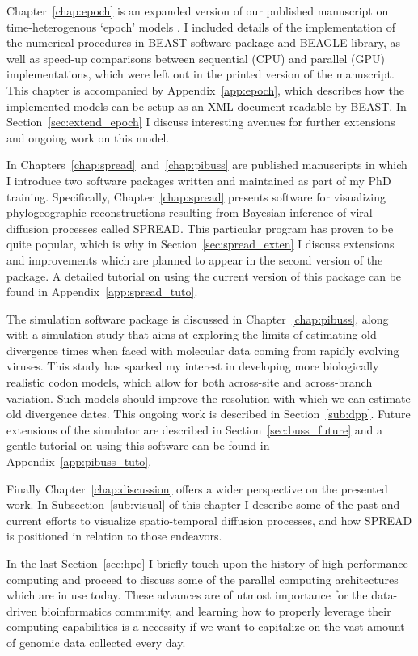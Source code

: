 Chapter~\ref{chap:epoch} is an expanded version of our published manuscript on time-heterogenous `epoch' models \citep{Bielejec2014a}.
I included details of the implementation of the numerical procedures in BEAST software package and BEAGLE library, as well as speed-up comparisons between sequential (CPU) and parallel (GPU) implementations, which were left out in the printed version of the manuscript.
This chapter is accompanied by Appendix~\ref{app:epoch}, which describes how the implemented models can be setup as an XML document readable by BEAST.
In Section~\ref{sec:extend_epoch} I discuss interesting avenues for further extensions and ongoing work on this model.

In Chapters~\ref{chap:spread}~and~\ref{chap:pibuss} are published manuscripts in which I introduce two software packages written and maintained as part of my PhD training.
Specifically, Chapter~\ref{chap:spread} presents software for visualizing phylogeographic reconstructions resulting from Bayesian inference of viral diffusion processes called SPREAD.
This particular program has proven to be quite popular, which is why in Section~\ref{sec:spread_exten} I discuss extensions and improvements which are planned to appear in the second version of the package.
A detailed tutorial on using the current version of this package can be found in Appendix~\ref{app:spread_tuto}.

The {\bussname} simulation software package is discussed in Chapter~\ref{chap:pibuss}, along with a simulation study that aims at exploring the limits of estimating old divergence times when faced with molecular data coming from rapidly evolving viruses.
This study has sparked my interest in developing more biologically realistic codon models, which allow for both across-site and across-branch variation.
Such models should improve the resolution with which we can estimate old divergence dates. %
This ongoing work is described in Section~\ref{sub:dpp}.
Future extensions of the {\bussname} simulator are described in Section~\ref{sec:buss_future} and a gentle tutorial on using this software can be found in Appendix~\ref{app:pibuss_tuto}.

Finally Chapter~\ref{chap:discussion} offers a wider perspective on the presented work. 
In Subsection~\ref{sub:visual} of this chapter I describe some of the past and current efforts to visualize spatio-temporal diffusion processes, and how SPREAD is positioned in relation to those endeavors.

In the last Section~\ref{sec:hpc} I briefly touch upon the history of high-performance computing and proceed to discuss some of the parallel computing architectures which are in use today. 
These advances are of utmost importance for the data-driven bioinformatics community, and learning how to properly leverage their computing capabilities is a necessity if we want to capitalize on the vast amount of genomic data collected every day.









